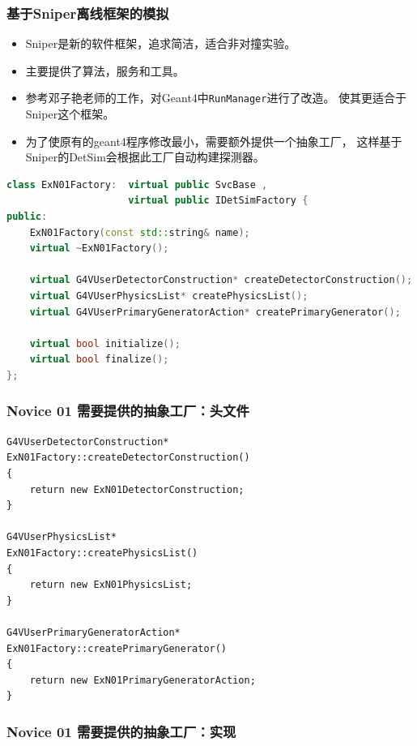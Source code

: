 \begin{frame}
    \frametitle{基于Sniper离线框架的模拟}
    \begin{itemize}
        \item Sniper是新的软件框架，追求简洁，适合非对撞实验。
        \item 主要提供了算法，服务和工具。
        \item 参考邓子艳老师的工作，对Geant4中{\tt RunManager}进行了改造。
              使其更适合于Sniper这个框架。
        \item 为了使原有的geant4程序修改最小，需要额外提供一个抽象工厂，
              这样基于Sniper的DetSim会根据此工厂自动构建探测器。
    \end{itemize}
    \par\usebox{\NoviceJobOptions}
\end{frame}

\newsavebox{\NoviceHeader}
\begin{lrbox}{\NoviceHeader}
\begin{lstlisting}[language=c++]
class ExN01Factory:  virtual public SvcBase , 
                     virtual public IDetSimFactory {
public:
    ExN01Factory(const std::string& name);
    virtual ~ExN01Factory();

    virtual G4VUserDetectorConstruction* createDetectorConstruction();
    virtual G4VUserPhysicsList* createPhysicsList();
    virtual G4VUserPrimaryGeneratorAction* createPrimaryGenerator();

    virtual bool initialize();
    virtual bool finalize();
};
\end{lstlisting}
\end{lrbox}

\begin{frame}
    \frametitle{Novice 01 需要提供的抽象工厂：头文件}
    \par\usebox{\NoviceHeader}
\end{frame}

\newsavebox{\NoviceImpl}
\begin{lrbox}{\NoviceImpl}
\begin{lstlisting}
G4VUserDetectorConstruction*
ExN01Factory::createDetectorConstruction()
{   
    return new ExN01DetectorConstruction;
}

G4VUserPhysicsList*
ExN01Factory::createPhysicsList()
{   
    return new ExN01PhysicsList;
}

G4VUserPrimaryGeneratorAction*
ExN01Factory::createPrimaryGenerator()
{   
    return new ExN01PrimaryGeneratorAction;
}
\end{lstlisting}
\end{lrbox}

\begin{frame}
    \frametitle{Novice 01 需要提供的抽象工厂：实现}
    \par\usebox{\NoviceImpl}
\end{frame}

